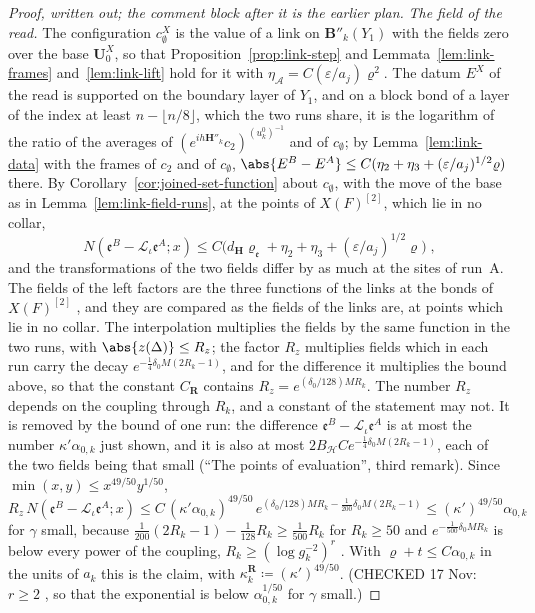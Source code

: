 \begin{proof}[Proof, written out; the comment block after it is the earlier plan]
\emph{The field of the read.} The configuration $c^X_\emptyset$ is the value of a link on $\mathbf B''_k(Y_1)$ with the fields zero over the base $\mathbf U^X_0$, so that Proposition~\ref{prop:link-step} and Lemmata~\ref{lem:link-frames} and~\ref{lem:link-lift} hold for it with $\eta_{\mathcal A} = C(\varepsilon/a_j)\varrho^2$. The datum $E^X$ of the read is supported on the boundary layer of $Y_1$, and on a block bond of a layer of the index at least $n - \lfloor n/8\rfloor$, which the two runs share, it is the logarithm of the ratio of the averages of $(e^{ih\mathbf H''_k}c_2)^{(u^0_k)^{-1}}$ and of $c_\emptyset$; by Lemma~\ref{lem:link-data} with the frames of $c_2$ and of $c_\emptyset$, $\abs{E^B - E^A} \leq C(\eta_2 + \eta_3 + (\varepsilon/a_j)^{1/2}\varrho)$ there. By Corollary~\ref{cor:joined-set-function} about $c_\emptyset$, with the move of the base as in Lemma~\ref{lem:link-field-runs}, at the points of $X(F)^{[2]}$, which lie in no collar,
\[
    N(\mathfrak e^B - \mathcal L_\iota\mathfrak e^A; x) \leq C\bigl(d_{\mathbf H}\varrho_{\mathfrak e} + \eta_2 + \eta_3 + (\varepsilon/a_j)^{1/2}\varrho\bigr)\;,
\]
and the transformations \cite[(106)]{BalabanAVG} of the two fields differ by as much at the sites of run~A. The fields of the left factors are the three functions of the links at the bonds of $X(F)^{[2]}$ \cite[(1.59), (1.60), p.~372]{BalabanLFR2}, and they are compared as the fields of the links are, at points which lie in no collar. The interpolation multiplies the fields by the same function in the two runs, with $\abs{z(\Delta)} \leq R_z$; the factor $R_z$ multiplies fields which in each run carry the decay $e^{-\frac{1}{4}\delta_0M(2R_k-1)}$, and for the difference it multiplies the bound above, so that the constant $C_{\mathbf R}$ contains $R_z = e^{(\delta_0/128)MR_k}$. The number $R_z$ depends on the coupling through $R_k$, and a constant of the statement may not. It is removed by the bound of one run: the difference $\mathfrak e^B - \mathcal L_\iota\mathfrak e^A$ is at most the number $\kappa'\alpha_{0,k}$ just shown, and it is also at most $2B_{\mathscr H}Ce^{-\frac{1}{4}\delta_0M(2R_k-1)}$, each of the two fields being that small (``The points of evaluation'', third remark). Since $\min(x, y) \leq x^{49/50}y^{1/50}$,
\[
    R_z\,N(\mathfrak e^B - \mathcal L_\iota\mathfrak e^A; x) \leq C\,(\kappa'\alpha_{0,k})^{49/50}\,e^{(\delta_0/128)MR_k - \frac{1}{200}\delta_0M(2R_k-1)} \leq (\kappa')^{49/50}\alpha_{0,k}
\]
for $\gamma$ small, because $\frac{1}{200}(2R_k - 1) - \frac{1}{128}R_k \geq \frac{1}{500}R_k$ for $R_k \geq 50$ and $e^{-\frac{1}{500}\delta_0MR_k}$ is below every power of the coupling, $R_k \geq (\log g_k^{-2})^r$ \cite[(2.5), p.~255]{BalabanCRE}. With $\varrho + t \leq C\alpha_{0,k}$ in the units of $a_k$ this is the claim, with $\kappa^{\mathbf R}_k \coloneqq (\kappa')^{49/50}$. (CHECKED 17 Nov: $r \geq 2$ \cite[pp.~245--246]{BalabanCRE}, so that the exponential is below $\alpha_{0,k}^{1/50}$ for $\gamma$ small.)
\end{proof}


